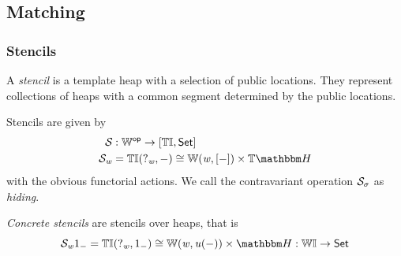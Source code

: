 
\subsection{Matching}

\subsubsection{Stencils}

A \emph{stencil} is a template heap with a selection of public locations. 
They represent collections of heaps with a common segment determined by the public locations.

\begin{definition}[Stencils]
    Stencils are given by
    \begin{align*}
    \stencilF\relax & : \opC\worldC \to \funC\tinstC\setC \\
    \stencilF\vw & = \homF\tinstC{?_{\vw}}\dash \iso \homF\worldC\vw{\anyL\dash} \times \theapF
    \end{align*}
    with the obvious functorial actions. We call the contravariant operation $\mathcal{S}_{\sigma}$ as \emph{hiding}.

    \emph{Concrete stencils} are stencils over heaps, that is 
    \[ \stencilF\vw\inclITI\dash = \homF\tinstC{?_{\vw}}{\inclITI\dash} \iso \homF\worldC\vw{\vu(\dash)} \times \heapF : \instC \to \setC \]
\end{definition}

